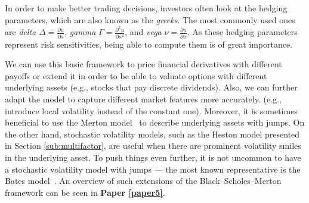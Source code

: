 \documentclass{UUThesisTemplate}
\begin{document}
\par
In order to make better trading decisions, investors often look at the hedging parameters, which are also known as the \emph{greeks}. The most commonly used ones are \emph{delta} $\Delta = \frac{\partial u}{\partial s}$, \emph{gamma} $\Gamma = \frac{\partial^2 u}{\partial s^2}$, and \emph{vega} $\nu = \frac{\partial u}{\partial \sigma}$. As these hedging parameters represent risk sensitivities, being able to compute them is of great importance.

\par
We can use this basic framework to price financial derivatives with different payoffs or extend it in order to be able to valuate options with different underlying assets (e.g., stocks that pay discrete dividends). Also, we can further adapt the model to capture different market features more accurately. (e.g., introduce local volatility instead of the constant one). Moreover, it is sometimes beneficial to use the Merton model~\cite{merton1976option} to describe underlying assets with jumps. On the other hand, stochastic volatility models, such as the Heston model presented in Section \ref{sub:multifactor}, are useful when there are prominent volatility smiles in the underlying asset. To push things even further, it is not uncommon to have a stochastic volatility model with jumps --- the most known representative is the Bates model~\cite{bates1996jumps}. An overview of such extensions of the Black--Scholes--Merton framework can be seen in \textbf{Paper \ref{paper5}}.
%
%
\end{document}
